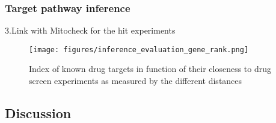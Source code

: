 \subsubsection{Target pathway inference}
3.Link with Mitocheck for the hit experiments


\begin{figure*}[ht!]
\centerline{\texttt{[image: figures/inference\_evaluation\_gene\_rank.png]}
}
\caption{Index of known drug targets in function of their closeness to drug screen experiments as measured by the different distances}
\label{gene_rank}
\end{figure*}




\subsection{Discussion}





